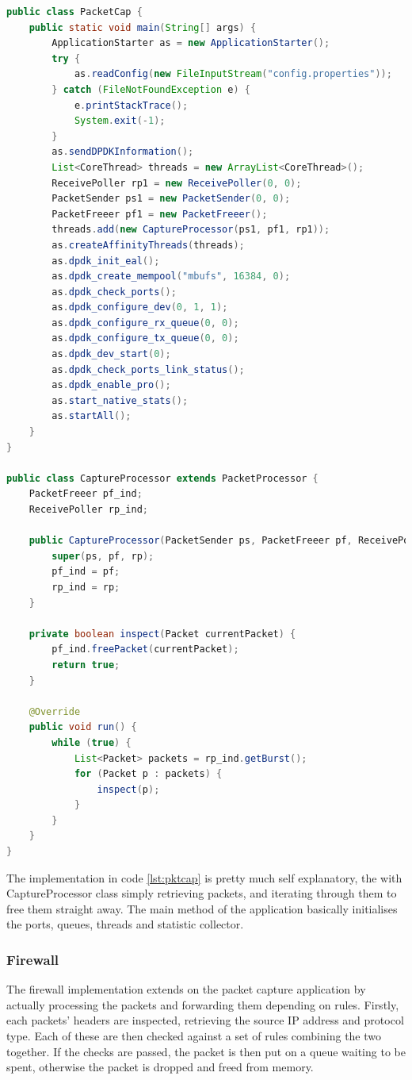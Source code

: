 \documentclass[final_report.tex]{subfiles}
\begin{document}
\begin{lstlisting}[language=java, caption={Full packet capture program}, label=lst:pktcap]
public class PacketCap {
	public static void main(String[] args) {
		ApplicationStarter as = new ApplicationStarter();
		try {
			as.readConfig(new FileInputStream("config.properties"));
		} catch (FileNotFoundException e) {
			e.printStackTrace();
			System.exit(-1);
		}
		as.sendDPDKInformation();
		List<CoreThread> threads = new ArrayList<CoreThread>();	
		ReceivePoller rp1 = new ReceivePoller(0, 0);
		PacketSender ps1 = new PacketSender(0, 0);
		PacketFreeer pf1 = new PacketFreeer();
		threads.add(new CaptureProcessor(ps1, pf1, rp1));
		as.createAffinityThreads(threads);
		as.dpdk_init_eal();
		as.dpdk_create_mempool("mbufs", 16384, 0);
		as.dpdk_check_ports();
		as.dpdk_configure_dev(0, 1, 1);
		as.dpdk_configure_rx_queue(0, 0);
		as.dpdk_configure_tx_queue(0, 0);
		as.dpdk_dev_start(0);
		as.dpdk_check_ports_link_status();
		as.dpdk_enable_pro();
		as.start_native_stats();
		as.startAll();		
	}	
}

public class CaptureProcessor extends PacketProcessor {
	PacketFreeer pf_ind;
	ReceivePoller rp_ind;
	
	public CaptureProcessor(PacketSender ps, PacketFreeer pf, ReceivePoller rp) {
		super(ps, pf, rp);
		pf_ind = pf;
		rp_ind = rp;
	}
	
	private boolean inspect(Packet currentPacket) {
		pf_ind.freePacket(currentPacket);
		return true;
	}
	
	@Override
	public void run() {
		while (true) {
			List<Packet> packets = rp_ind.getBurst();
			for (Packet p : packets) {
				inspect(p);
			}
		}
	}
}
\end{lstlisting}

The implementation in code \ref{lst:pktcap} is pretty much self explanatory, the with CaptureProcessor class simply retrieving packets, and iterating through them to free them straight away. The main method of the application basically initialises the ports, queues, threads and statistic collector.

\subsubsection{Firewall}
The firewall implementation extends on the packet capture application by actually processing the packets and forwarding them depending on rules. Firstly, each packets' headers are inspected, retrieving the source IP address and protocol type. Each of these are then checked against a set of rules combining the two together. If the checks are passed, the packet is then put on a queue waiting to be spent, otherwise the packet is dropped and freed from memory.
\end{document}
